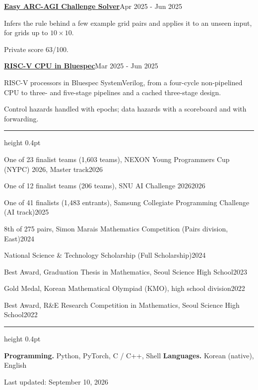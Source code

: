 \documentclass[letterpaper,10pt]{article}
\newcommand{\heading}[1]{%
  \par\vspace{6.5pt}%
  {\Large\bfseries\rule{0pt}{10pt}\smash{#1}}\par
  \vspace{4.5pt}%
  \hrule height 0.4pt
  \vspace{5pt}%
}
\newenvironment{resbody}%
  {\begin{list}{}{%
     \setlength{\leftmargin}{0.175in}%
     \setlength{\rightmargin}{0pt}%
     \setlength{\topsep}{2pt}%
     \setlength{\parsep}{0pt}%
     \setlength{\itemsep}{0pt}%
   }\item[]}%
  {\par\strut\vspace{-\baselineskip}\end{list}}
\newcommand{\rline}[2]{{\setlength{\parfillskip}{0pt}\strut #1\hfill #2\par}}
\newcommand{\entry}[2]{\rline{\textbf{#1}}{#2}}
\newcommand{\award}[2]{\rline{#1}{#2}\vspace{1.6pt}}
\newcommand{\entrygap}{\vspace{3pt}}
\begin{document}
\begin{resbody}
  \entrygap
  \entry{\href{https://github.com/Birmjune/Easy-ARC-AGI-solver}{Easy ARC-AGI Challenge Solver}}{Apr 2025 - Jun 2025}
  \begin{points}
    \item Infers the rule behind a few example grid pairs and applies it to an unseen input,
      for grids up to $10 \times 10$.
    \item Private score 63/100.
  \end{points}
  \entrygap
  \entry{\href{https://github.com/Birmjune/RISC-V_BluespecVerilog}{RISC-V CPU in Bluespec}}{Mar 2025 - Jun 2025}
  \begin{points}
    \item RISC-V processors in Bluespec SystemVerilog, from a four-cycle non-pipelined CPU to
      three- and five-stage pipelines and a cached three-stage design.
    \item Control hazards handled with epochs; data hazards with a scoreboard and with forwarding.
  \end{points}
\end{resbody}


\pagebreak
\heading{Honors and Awards}
\begin{resbody}
  \award{One of 23 finalist teams (1,603 teams), NEXON Young Programmers Cup (NYPC) 2026, Master track}{2026}
  \award{One of 12 finalist teams (206 teams), SNU AI Challenge 2026}{2026}
  \award{One of 41 finalists (1,483 entrants), Samsung Collegiate Programming Challenge (AI track)}{2025}
  \award{8th of 275 pairs, Simon Marais Mathematics Competition (Pairs division, East)}{2024}
  \award{National Science \& Technology Scholarship (Full Scholarship)}{2024}
  \award{Best Award, Graduation Thesis in Mathematics, Seoul Science High School}{2023}
  \award{Gold Medal, Korean Mathematical Olympiad (KMO), high school division}{2022}
  \award{Best Award, R\&E Research Competition in Mathematics, Seoul Science High School}{2022}
\end{resbody}


\heading{Skills}
\begin{resbody}
  \strut\textbf{Programming.} Python, PyTorch, C / C++, Shell \quad
  \textbf{Languages.} Korean (native), English
\end{resbody}


\vfill
\begin{center}
  {\small Last updated: September 10, 2026}
\end{center}
\end{document}
